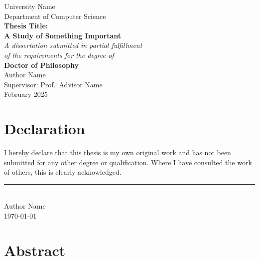 \documentclass[12pt,a4paper,oneside]{book}
\theoremstyle{plain}
\theoremstyle{definition}
\theoremstyle{remark}
\begin{document}
\frontmatter

\begin{titlepage}
\begin{center}
\vspace*{2cm}

{\Large University Name}\\[0.5cm]
{\large Department of Computer Science}\\[3cm]

{\Huge\bfseries\color{chaptercolor} Thesis Title:\\[0.3cm]
A Study of Something Important}\\[2cm]

{\Large\textit{A dissertation submitted in partial fulfillment\\
of the requirements for the degree of}}\\[1cm]

{\Large\bfseries Doctor of Philosophy}\\[2cm]

{\large Author Name}\\[0.5cm]
{\large Supervisor: Prof.\ Advisor Name}\\[2cm]

{\large February 2025}

\vfill
\end{center}
\end{titlepage}

\chapter*{Declaration}

I hereby declare that this thesis is my own original work and has not been submitted for any other degree or qualification. Where I have consulted the work of others, this is clearly acknowledged.

\vspace{2cm}
\noindent\rule{6cm}{0.4pt}\\
Author Name\\
\today

\chapter*{Abstract}
\end{document}
